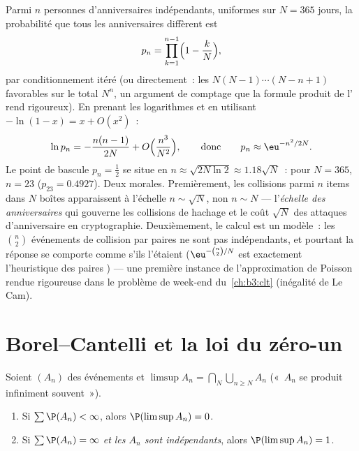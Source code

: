 \begin{example}
\label{ex:b3:probability:birthday}
Parmi $n$ personnes d'anniversaires indépendants, uniformes
sur $N = 365$ jours, la probabilité que tous les
anniversaires diffèrent est
\[
p_n = \prod_{k=1}^{n-1}\Bigl(1 - \frac kN\Bigr),
\]
par conditionnement itéré (ou directement~: les
$N(N-1)\cdots(N - n + 1)$ favorables sur le total $N^n$, un
argument de comptage que la formule produit de
l' rend rigoureux). En prenant les logarithmes
et en utilisant $-\ln(1 - x) = x + O(x^2)$~:
\[
\ln p_n = -\frac{n(n-1)}{2N} +
O\Bigl(\frac{n^3}{N^2}\Bigr),
\qquad\text{donc}\qquad
p_n \approx \eu^{-n^2/2N} .
\]
Le point de bascule $p_n = \frac12$ se situe en $n \approx
\sqrt{2N\ln2} \approx 1.18\sqrt N$~: pour $N = 365$, $n =
23$ ($p_{23} = 0.4927$). Deux morales. Premièrement, les
collisions parmi $n$ items dans $N$ boîtes apparaissent à
l'échelle $n \sim \sqrt N$, non $n \sim N$ ---
l'\emph{échelle des anniversaires} qui gouverne les
collisions de hachage et le coût $\sqrt N$ des attaques
d'anniversaire en cryptographie. Deuxièmement, le calcul
est un modèle~: les $\binom n2$ événements de collision par
paires ne sont pas indépendants, et pourtant la réponse se
comporte comme s'ils l'étaient
($\eu^{-\binom n2/N}$ est exactement l'heuristique des
paires ) --- une première instance de
l'approximation de Poisson rendue rigoureuse dans le
problème de week-end du~\cref{ch:b3:clt} (inégalité de Le
Cam).
\end{example}

\section{Borel--Cantelli et la loi du zéro-un}

\begin{theorem}
\label{thm:b3:probability:borelcantelli}
Soient $(A_n)$ des événements et $\limsup A_n = \bigcap_N
\bigcup_{n\geq N}A_n$ («~$A_n$ se produit infiniment
souvent~»).
\begin{enumerate}
  \item Si $\sum\P(A_n) < \infty$, alors $\P(\limsup A_n) =
        0$.
  \item Si $\sum\P(A_n) = \infty$ \emph{et les $A_n$ sont
        indépendants}, alors $\P(\limsup A_n) = 1$.
\end{enumerate}
\end{theorem}


